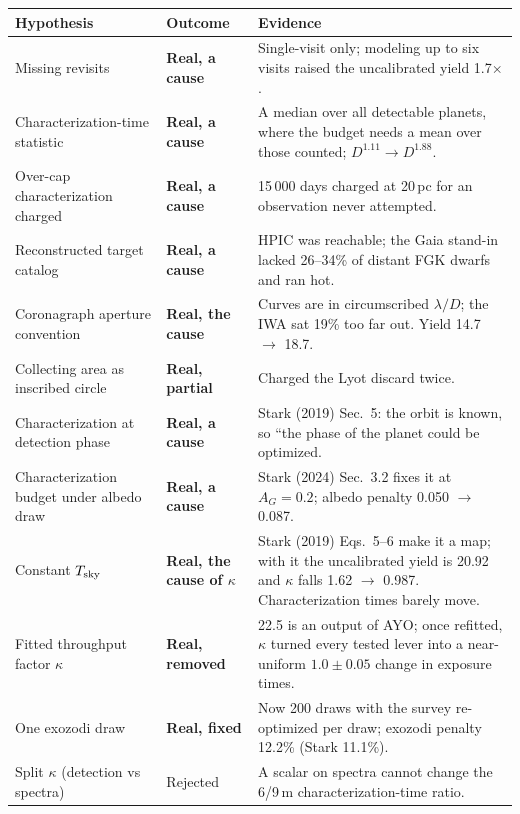\documentclass[11pt,a4paper]{article}
\begin{document}
\begin{table}[htbp]
\centering
\scriptsize
\begin{tabular}{p{4.6cm}p{2.6cm}p{8.0cm}}
\toprule
\textbf{Hypothesis} & \textbf{Outcome} & \textbf{Evidence} \\
\midrule
Missing revisits & \textbf{Real, a cause} & Single-visit only; modeling up to six visits raised the uncalibrated yield 1.7$\times$. \\
Characterization-time statistic & \textbf{Real, a cause} & A median over all detectable planets, where the budget needs a mean over those counted; $D^{1.11} \to D^{1.88}$. \\
Over-cap characterization charged & \textbf{Real, a cause} & 15\,000 days charged at 20\,pc for an observation never attempted. \\
Reconstructed target catalog & \textbf{Real, a cause} & HPIC was reachable; the Gaia stand-in lacked 26--34\% of distant FGK dwarfs and ran hot. \\
Coronagraph aperture convention & \textbf{Real, the cause} & Curves are in circumscribed $\lambda/D$; the IWA sat 19\% too far out. Yield 14.7 $\to$ 18.7. \\
Collecting area as inscribed circle & \textbf{Real, partial} & Charged the Lyot discard twice. \\
Characterization at detection phase & \textbf{Real, a cause} & Stark (2019) Sec.~5: the orbit is known, so ``the phase of the planet could be optimized. \\
Characterization budget under albedo draw & \textbf{Real, a cause} & Stark (2024) Sec.~3.2 fixes it at $A_G = 0.2$; albedo penalty 0.050 $\to$ 0.087. \\
Constant $T_{\rm sky}$ & \textbf{Real, the cause of $\kappa$} & Stark (2019) Eqs.~5--6 make it a map; with it the uncalibrated yield is 20.92 and $\kappa$ falls 1.62 $\to$ 0.987. Characterization times barely move. \\
Fitted throughput factor $\kappa$ & \textbf{Real, removed} & 22.5 is an output of AYO; once refitted, $\kappa$ turned every tested lever into a near-uniform $1.0 \pm 0.05$ change in exposure times. \\
One exozodi draw & \textbf{Real, fixed} & Now 200 draws with the survey re-optimized per draw; exozodi penalty 12.2\% (Stark 11.1\%). \\
Split $\kappa$ (detection vs spectra) & Rejected & A scalar on spectra cannot change the 6/9\,m characterization-time ratio. \\

\end{tabular}
\end{table}
\end{document}

